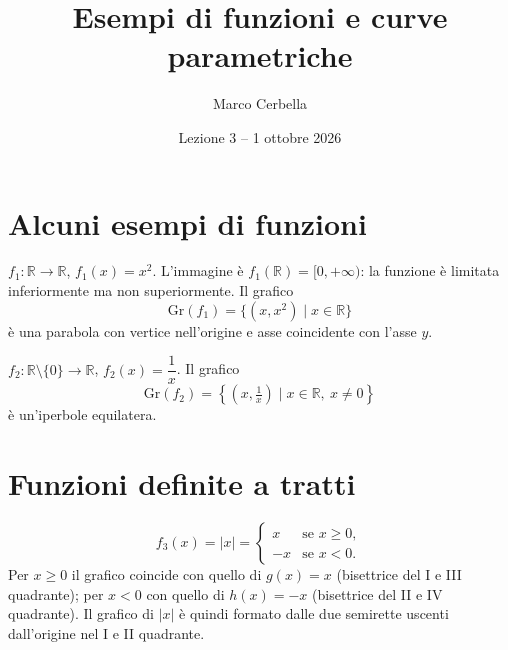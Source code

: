 \documentclass[11pt,a4paper]{article}
\title{Esempi di funzioni e curve parametriche}
\author{Marco Cerbella}
\date{Lezione 3 -- 1 ottobre 2026}
\begin{document}
\maketitle

\section{Alcuni esempi di funzioni}

\begin{esempio}[$f_1(x) = x^2$]
$f_1 : \mathbb{R} \to \mathbb{R}$, $f_1(x) = x^2$. L'immagine è $f_1(\mathbb{R}) = [0, +\infty)$: la funzione è limitata inferiormente ma non superiormente. Il grafico
\[
\mathrm{Gr}(f_1) = \{(x, x^2) \mid x \in \mathbb{R}\}
\]
è una parabola con vertice nell'origine e asse coincidente con l'asse $y$.
\end{esempio}

\begin{esempio}[$f_2(x) = 1/x$]
$f_2 : \mathbb{R} \setminus \{0\} \to \mathbb{R}$, $f_2(x) = \dfrac1x$. Il grafico
\[
\mathrm{Gr}(f_2) = \left\{\left(x, \tfrac1x\right) \mid x \in \mathbb{R},\ x \neq 0\right\}
\]
è un'iperbole equilatera.
\end{esempio}

\begin{center}
\end{center}

\section{Funzioni definite a tratti}

\begin{esempio}
\[
f_3(x) = |x| = \begin{cases} x & \text{se } x \geq 0, \\ -x & \text{se } x < 0. \end{cases}
\]
Per $x \geq 0$ il grafico coincide con quello di $g(x) = x$ (bisettrice del I e III quadrante); per $x < 0$ con quello di $h(x) = -x$ (bisettrice del II e IV quadrante). Il grafico di $|x|$ è quindi formato dalle due semirette uscenti dall'origine nel I e II quadrante.
\end{esempio}
\end{document}
